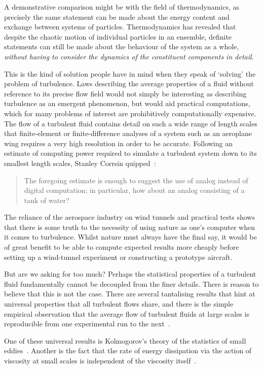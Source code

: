 A demonstrative comparison might be with the field of thermodynamics, as precisely the same statement can be made about the energy content and exchange between systems of particles. Thermodynamics has revealed that despite the chaotic motion of individual particles in an ensemble, definite statements can still be made about the behaviour of the system as a whole, \emph{without having to consider the dynamics of the constituent components in detail}.

This is the kind of solution people have in mind when they speak of `solving' the problem of turbulence. Laws describing the average properties of a fluid without reference to its precise flow field would not simply be interesting as describing turbulence as an emergent phenomenon, but would aid practical computations, which for many problems of interest are prohibitively computationally expensive. The flow of a turbulent fluid contains detail on such a  wide range of length scales that finite-element or finite-difference analyses of a system such as an aeroplane wing requires a very high resolution in order to be accurate. Following an estimate of computing power required to simulate a turbulent system down to its smallest length scales, Stanley Corrsin quipped~\cite{corrsin_turbulent_1961}:
\begin{quote}
The foregoing estimate  is enough to suggest the use of analog instead of digital  computation; in particular, how about an analog consisting of a tank of water?
\end{quote}
The reliance of the aerospace industry on wind tunnels and practical tests shows that there is some truth to the necessity of using nature as one's computer when it comes to turbulence. Whilst nature must always have the final say, it would be of great benefit to be able to compute expected results more cheaply before setting up a wind-tunnel experiment or constructing a prototype aircraft.

But are we asking for too much? Perhaps the statistical properties of a turbulent fluid fundamentally cannot be decoupled from the finer details. There is reason to believe that this is not the case. There are several tantalising results that hint at universal properties that all turbulent flows share, and there is the simple empirical observation that the average flow of turbulent fluids at large scales is reproducible from one experimental run to the next~\cite[pp 13, 86]{davidson_turbulence:_2004}.

One of these universal results is Kolmogorov's theory of the statistics of small eddies~\cite{kolmogorov_local_1941, spalding_kolmogorovs_1991}. Another is the fact that the rate of energy dissipation via the action of viscosity at small scales is independent of the viscosity itself~\cite[p 77]{davidson_turbulence:_2004}.

